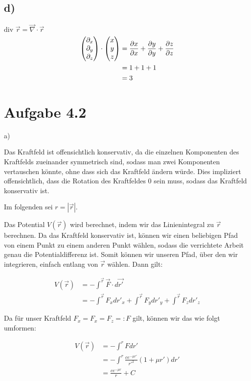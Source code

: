 \documentclass{theozettel}
\begin{document}
\subsection*{d)}$\text{div }\vec{r}=\vec{\nabla}\cdot\vec{r}$
\begin{align*}
\mqty(\partial_x\\\partial_y\\\partial_z)\cdot\mqty(x\\y\\z)&=\frac{\partial x}{\partial x}+\frac{\partial y}{\partial y}+\frac{\partial z}{\partial z}\\
&=1+1+1\\
&=3
\end{align*}

\newpage
\section*{Aufgabe 4.2}

a)

Das Kraftfeld ist offensichtlich konservativ, da die einzelnen Komponenten des Kraftfelds zueinander symmetrisch sind, sodass man zwei Komponenten vertauschen könnte, ohne dass sich das Kraftfeld ändern würde. Dies impliziert offensichtlich, dass die Rotation des Kraftfeldes $0$ sein muss, sodass das Kraftfeld konservativ ist.

Im folgenden sei $r = |\vec{r}|$.

Das Potential $V(\vec{r})$ wird berechnet, indem wir das Linienintegral zu $\vec{r}$ berechnen.
Da das Kraftfeld konservativ ist, können wir einen beliebigen Pfad von einem Punkt zu einem anderen Punkt wählen, sodass die verrichtete Arbeit genau die Potentialdifferenz ist. Somit können wir unseren Pfad, über den wir integrieren, einfach entlang von $\vec{r}$ wählen. Dann gilt:

\begin{align}
V(\vec{r}) &= - \int^{\vec{r}} \vec{F} \cdot d \vec{r'} \\
&= - \int^{\vec{r}} F_x d r'_x + \int^{\vec{r}} F_y d r'_y + \int^{\vec{r}} F_z d r'_z 
\end{align}

Da für unser Kraftfeld $F_x = F_x = F_z =: F$ gilt, können wir das wie folgt umformen:

\begin{align}
V(\vec{r}) &= - \int^{r} F dr' \\
&= - \int^{r} \frac{c e^{-\mu r'}}{r'^{2}} (1 + \mu r') dr' \\
&= \frac{c e^{- \mu r}}{r} + C
\end{align}
\end{document}
